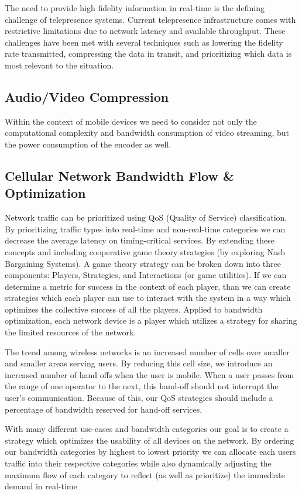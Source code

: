 \documentclass[a4paper,12pt]{report}
\begin{document}
The need to provide high fidelity information in real-time is the defining challenge of telepresence systems. Current telepresence infrastructure comes with restrictive limitations due to network latency and available throughput. These challenges have been met with several techniques such as lowering the fidelity rate transmitted, compressing the data in transit, and prioritizing which data is most relevant to the situation.

\subsection{Audio/Video Compression}

Within the context of mobile devices we need to consider not only the computational complexity and bandwidth consumption of video streaming, but the power consumption of the encoder as well.
\cite{5054795}
\subsection{Cellular Network Bandwidth Flow \& Optimization}

Network traffic can be prioritized using QoS (Quality of Service) classification. By prioritizing traffic types into real-time and non-real-time categories we can decrease the average latency on timing-critical services. By extending these concepts and including cooperative game theory strategies (by exploring Nash Bargaining Systems). A game theory strategy can be broken down into three components: Players, Strategies, and Interactions (or game utilities). If we can determine a metric for success in the context of each player, than we can create strategies which each player can use to interact with the system in a way which optimizes the collective success of all the players. Applied to bandwidth optimization, each network device is a player which utilizes a strategy for sharing the limited resources of the network.

The trend among wireless networks is an increased number of cells over smaller and smaller areas serving users. By reducing this cell size, we introduce an increased number of hand offs when the user is mobile. When a user passes from the range of one operator to the next, this hand-off should not interrupt the user's communication. Because of this, our QoS strategies should include a percentage of bandwidth reserved for hand-off services. 

With many different use-cases and bandwidth categories our goal is to create a strategy which optimizes the usability of all devices on the network. By ordering our bandwidth categories by highest to lowest priority we can allocate each users traffic into their respective categories while also dynamically adjusting the maximum flow of each category to reflect (as well as prioritize) the immediate demand in real-time
\cite{5710522,1300874,1376696}
\end{document}
